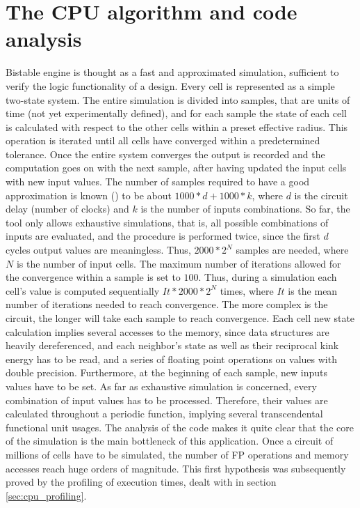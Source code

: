 \section{The CPU algorithm and code analysis}\label{sec:cpu_algorithm}
Bistable engine is thought as a fast and approximated simulation, sufficient to verify the logic functionality of a design. 
Every cell is represented as a simple two-state system. The entire simulation is divided into samples, that are units of time 
(not yet experimentally defined), and for each sample the state of each cell is calculated with respect to the other cells within 
a preset effective radius. This operation is iterated until all cells have converged within a predetermined tolerance. 
Once the entire system converges the output is recorded and the computation goes on with the next sample, after having updated
 the input cells with new input values.
The number of samples required to have a good approximation is known (\cite{site:MinaBistable}) to be about $1000*d+1000*k$, where $d$ is the circuit delay (number of clocks) and $k$ is the number of inputs combinations. So far, the tool only allows exhaustive simulations, that is, all possible combinations of inputs are evaluated, and the procedure is performed twice, since the first $d$ cycles output values are meaningless. Thus, $2000*2^N$ samples are needed, where $N$ is the number of input cells.
 The maximum number of iterations allowed for the convergence within a sample is set to $100$. Thus, during a simulation each cell's value 
is computed sequentially $It*2000*2^N$ times, where $It$ is the mean number of iterations needed to reach convergence. 
The more complex is the circuit, the longer will take each sample to reach convergence. Each cell new state calculation implies several accesses to the memory, since data structures are heavily dereferenced, and each neighbor's state as well as their reciprocal kink energy has to be read, and a series of floating point operations on values with double precision. Furthermore, at the beginning of each sample, new inputs values have to be set. As far as exhaustive simulation is concerned, every combination of input values has to be processed. Therefore, their values are calculated throughout a periodic function, implying several transcendental functional unit usages.\newline
The analysis of the code makes it quite clear that the core of the simulation is the main bottleneck of this application. Once a circuit of millions of cells have to be simulated, the number of FP operations and memory accesses reach huge orders of magnitude. This first hypothesis was subsequently proved by the profiling of execution times, dealt with in section \ref{sec:cpu_profiling}.


